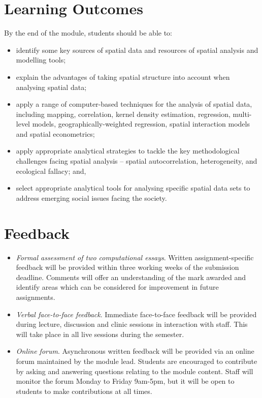 \documentclass[
  letterpaper,
  DIV=11,
  numbers=noendperiod]{scrreprt}
\providecommand{\tightlist}{%
  \setlength{\itemsep}{0pt}\setlength{\parskip}{0pt}}\usepackage{longtable,booktabs,array}
\begin{document}
\hypertarget{learning-outcomes}{%
\section{Learning Outcomes}\label{learning-outcomes}}

By the end of the module, students should be able to:

\begin{itemize}
\tightlist
\item
  identify some key sources of spatial data and resources of spatial
  analysis and modelling tools;
\item
  explain the advantages of taking spatial structure into account when
  analysing spatial data;
\item
  apply a range of computer-based techniques for the analysis of spatial
  data, including mapping, correlation, kernel density estimation,
  regression, multi-level models, geographically-weighted regression,
  spatial interaction models and spatial econometrics;
\item
  apply appropriate analytical strategies to tackle the key
  methodological challenges facing spatial analysis -- spatial
  autocorrelation, heterogeneity, and ecological fallacy; and,
\item
  select appropriate analytical tools for analysing specific spatial
  data sets to address emerging social issues facing the society.
\end{itemize}

\hypertarget{feedback}{%
\section{Feedback}\label{feedback}}

\begin{itemize}
\item
  \emph{Formal assessment of two computational essays}. Written
  assignment-specific feedback will be provided within three working
  weeks of the submission deadline. Comments will offer an understanding
  of the mark awarded and identify areas which can be considered for
  improvement in future assignments.
\item
  \emph{Verbal face-to-face feedback}. Immediate face-to-face feedback
  will be provided during lecture, discussion and clinic sessions in
  interaction with staff. This will take place in all live sessions
  during the semester.
\item
  \emph{Online forum}. Asynchronous written feedback will be provided
  via an online forum maintained by the module lead. Students are
  encouraged to contribute by asking and answering questions relating to
  the module content. Staff will monitor the forum Monday to Friday
  9am-5pm, but it will be open to students to make contributions at all
  times.
\end{itemize}
\end{document}
